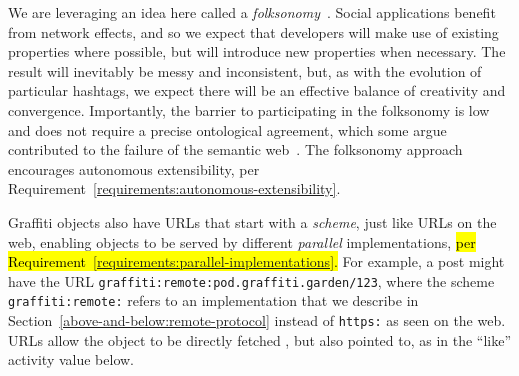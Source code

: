 We are leveraging an idea here called a \emph{folksonomy}~\cite{folksonomy}.
Social applications
benefit from network effects, and so we expect that developers will make use of
existing properties where possible,
but will introduce new properties when necessary.
The result will inevitably be messy and inconsistent, but, as with the evolution of
particular hashtags, we expect there will be an effective balance of creativity and convergence.
Importantly, the barrier to participating in the folksonomy is low
and does not require a precise ontological agreement,
which some argue contributed to the failure of the semantic
web~\cite{semanticwebtwodecades}.
The folksonomy approach encourages autonomous extensibility,
per Requirement~\ref{requirements:autonomous-extensibility}.

Graffiti objects also have URLs that
start with a \emph{scheme}, just like URLs on the web,
enabling objects to be served by different \emph{parallel} implementations,
\hl{%
per Requirement~{\ref{requirements:parallel-implementations}}.
}%
For example, a post might have the URL
\texttt{graffiti:\allowbreak{}remote:\allowbreak{}pod.\allowbreak{}graffiti.\allowbreak{}garden/\allowbreak{}123},
where the scheme \texttt{graffiti:\allowbreak{}remote:} refers to an implementation that we describe
in Section~\ref{above-and-below:remote-protocol}
instead of \texttt{https:} as seen on the web.
URLs allow the object to be directly fetched%
, but also pointed to, as in the
``like'' activity value below.


